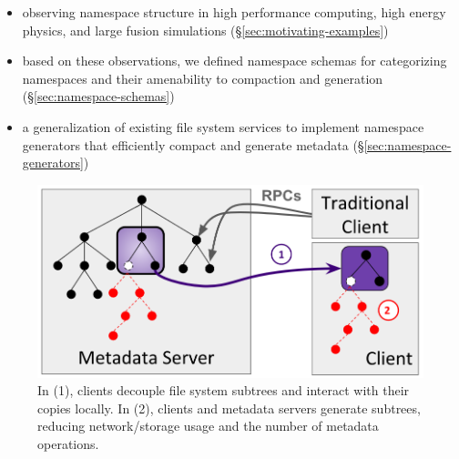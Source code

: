 \begin{itemize}
  \setlength\itemsep{-0.5em}

\item observing namespace structure in high performance computing, high energy
physics, and large fusion simulations (\S\ref{sec:motivating-examples})

\item based on these observations, we defined namespace schemas for
categorizing namespaces and their amenability to compaction and generation
(\S\ref{sec:namespace-schemas})

\item a generalization of existing file system services to implement namespace
generators that efficiently compact and generate metadata
(\S\ref{sec:namespace-generators}) \end{itemize}

\begin{figure}[t]
  \centering
  \includegraphics[width=0.5\linewidth]{./chapters/tintenfisch/figures/intro.png}
  \caption{In (1), clients decouple file system subtrees and interact with
their copies locally. In (2), clients and metadata servers generate subtrees,
reducing network/storage usage and the number of metadata operations.
\label{fig:intro}}
\end{figure}
